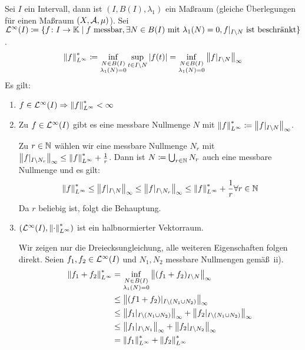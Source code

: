 \begin{beispiel*}
Sei $ I $ ein Intervall, dann ist $ (I,B(I),\lambda_1) $ ein Ma\ss raum (gleiche \"Uberlegungen f\"ur einen Ma\ss raum $ (X,\mathcal A,\mu) $). Sei $ \mathcal L^\infty(I)\coloneqq\lbrace f\colon I\rightarrow\mathbb{K}\mid f\text{ messbar}, \exists N\in B(I)\text{ mit }\lambda_1(N)=0, f|_{I\setminus N} \text{ ist beschr\"ankt}\rbrace $.
\[ \left\|f\right\|^\ast_{L^\infty}\coloneqq\inf_{\substack{N\in B(I)\\\lambda_1(N)=0}}\sup_{t\in I\setminus N}|f(t)|=\inf_{\substack{N\in B(I)\\\lambda_1(N)=0}}\left\|f|_{I\setminus N}\right\|_\infty \]
Es gilt:
\begin{enumerate}
\item $ f\in\mathcal L^\infty(I)\Rightarrow\left\|f\right\|^\ast_{L^\infty}<\infty $
\item Zu $ f\in\mathcal L^\infty(I) $ gibt es eine messbare Nullmenge $ N $ mit $ \left\|f\right\|^\ast_{L^\infty}\coloneqq\left\|f|_{I\setminus N}\right\|_\infty $.
\begin{beweis}
Zu $ r\in\mathbb{N} $ w\"ahlen wir eine messbare Nullmenge $ N_r $ mit $ \left\|f|_{I\setminus N_r}\right\|_\infty\leq\left\|f\right\|^\ast_{L^\infty}+\frac{1}{r} $. Dann ist $ N\coloneqq\bigcup_{r\in\mathbb{N}}N_r $ auch eine messbare Nullmenge und es gilt:
\[ \left\|f\right\|_{L^\infty}^\ast\leq \left\|f|_{I\setminus N}\right\|_\infty\leq\left\|f|_{I\setminus N_r}\right\|_\infty\leq\left\|f\right\|_{L^\infty}^\ast+\frac{1}{r}\forall r\in\mathbb{N} \]
Da $ r $ beliebig ist, folgt die Behauptung.
\end{beweis}
\item $ (\mathcal L^\infty(I),\left\|\cdot\right\|^\ast_{L^\infty}) $ ist ein halbnormierter Vektorraum.
\begin{beweis}
Wir zeigen nur die Dreiecksungleichung, alle weiteren Eigenschaften folgen direkt. Seien $ f_1, f_2\in\mathcal L^\infty(I) $ und $ N_1, N_2 $ messbare Nullmengen gem\"a\ss\ ii).
\begin{align*} \left\|f_1+f_2\right\|^\ast_{L^\infty}&=\inf_{\substack{N\in B(I)\\\lambda_1(N)=0}}\left\|(f_1+f_2)_{I\setminus N}\right\|_\infty\\&\leq\left\|(f1+f_2)|_{I\setminus(N_1\cup N_2)}\right\|_\infty\\&\leq\left\|f_1|_{I\setminus(N_1\cup N_2)}\right\|_\infty+\left\|f_2|_{I\setminus(N_1\cup N_2)}\right\|_\infty\\&\leq\left\|f_1|_{I\setminus N_1}\right\|_\infty+\left\|f_2|_{I\setminus N_2}\right\|_\infty\\&=\left\|f_1\right\|^\ast_{L^\infty}+\left\|f_2\right\|^\ast_{L^\infty} \end{align*}

\end{beweis}
\end{enumerate}
\end{beispiel*}
